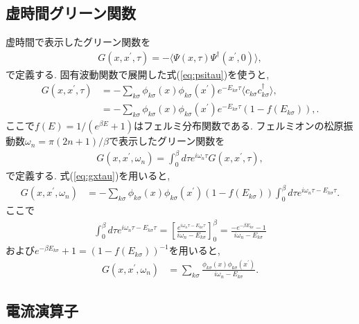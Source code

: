 \documentclass[10pt,a4j]{jarticle}
\begin{document}
\subsection{虚時間グリーン関数}

虚時間で表示したグリーン関数を
\begin{align}
G(x,x^\prime,\tau) = - \langle \Psi(x,\tau) \Psi^{\dagger}(x^\prime,0) \rangle,
\end{align}
で定義する. 固有波動関数で展開した式(\ref{eq:psitau})を使うと, 
\begin{align}
G(x,x^\prime,\tau) 
&= - \sum_{k\sigma} \phi_{k\sigma}(x) \phi_{k\sigma}(x^\prime) e^{-E_{k\sigma}\tau}
\langle c_{k\sigma} c_{k\sigma}^\dagger  \rangle, \nonumber \\
&= - \sum_{k\sigma} \phi_{k\sigma}(x) \phi_{k\sigma}(x^\prime) e^{-E_{k\sigma}\tau}
( 1- f(E_{k\sigma})), \label{eq:gxtau}.
\end{align}
ここで$f(E) = 1/(e^{\beta E}+1)$はフェルミ分布関数である. 
フェルミオンの松原振動数$\omega_n = \pi (2n+1)/\beta$で表示したグリーン関数を
\begin{align}
G(x,x^\prime,\omega_n) = \int_0^\beta d\tau e^{i\omega_n \tau} G(x,x^\prime,\tau),
\end{align}
で定義する. 式(\ref{eq:gxtau})を用いると, 
\begin{align}
G(x,x^\prime,\omega_n)  
&= - \sum_{k\sigma} \phi_{k\sigma}(x) \phi_{k\sigma}(x^\prime) 
( 1- f(E_{k\sigma}))
\int_0^\beta d\tau e^{i\omega_n \tau-E_{k\sigma}\tau}.
\end{align}
ここで
\begin{align}
\int_0^\beta d\tau e^{i\omega_n \tau-E_{k\sigma}\tau} = \left[
\frac{e^{i \omega_n \tau -E_{k\sigma} \tau }}{i \omega_n -E_{k\sigma}}
 \right]_0^\beta
= \frac{-e^{-\beta E_{k\sigma}} - 1}{i \omega_n -E_{k\sigma}}
\end{align}
および$e^{-\beta E_{k\sigma}} + 1 = (1-f(E_{k\sigma}))^{-1}$を用いると, 
\begin{align}
G(x,x^\prime,\omega_n)  
&= \sum_{k\sigma} \frac{\phi_{k\sigma}(x) \phi_{k\sigma}(x^\prime)}
{i \omega_n -E_{k\sigma}}.
\end{align}

\subsection{電流演算子}
\end{document}
